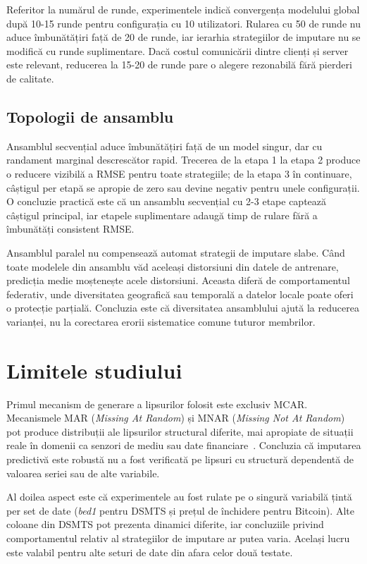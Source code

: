 Referitor la numărul de runde, experimentele indică convergența modelului global după 10-15 runde pentru configurația cu 10 utilizatori. Rularea cu 50 de runde nu aduce îmbunătățiri față de 20 de runde, iar ierarhia strategiilor de imputare nu se modifică cu runde suplimentare. Dacă costul comunicării dintre clienți și server este relevant, reducerea la 15-20 de runde pare o alegere rezonabilă fără pierderi de calitate.

\subsection{Topologii de ansamblu}

Ansamblul secvențial aduce îmbunătățiri față de un model singur, dar cu randament marginal descrescător rapid. Trecerea de la etapa 1 la etapa 2 produce o reducere vizibilă a RMSE pentru toate strategiile; de la etapa 3 în continuare, câștigul per etapă se apropie de zero sau devine negativ pentru unele configurații. O concluzie practică este că un ansamblu secvențial cu 2-3 etape captează câștigul principal, iar etapele suplimentare adaugă timp de rulare fără a îmbunătăți consistent RMSE.

Ansamblul paralel nu compensează automat strategii de imputare slabe. Când toate modelele din ansamblu văd aceleași distorsiuni din datele de antrenare, predicția medie moștenește acele distorsiuni. Aceasta diferă de comportamentul federativ, unde diversitatea geografică sau temporală a datelor locale poate oferi o protecție parțială. Concluzia este că diversitatea ansamblului ajută la reducerea varianței, nu la corectarea erorii sistematice comune tuturor membrilor.

\section{Limitele studiului}

Primul mecanism de generare a lipsurilor folosit este exclusiv MCAR. Mecanismele MAR (\textit{Missing At Random}) și MNAR (\textit{Missing Not At Random}) pot produce distribuții ale lipsurilor structural diferite, mai apropiate de situații reale în domenii ca senzori de mediu sau date financiare~\cite{rubin1976inference, little2002missing}. Concluzia că imputarea predictivă este robustă nu a fost verificată pe lipsuri cu structură dependentă de valoarea seriei sau de alte variabile.

Al doilea aspect este că experimentele au fost rulate pe o singură variabilă țintă per set de date (\textit{bed1} pentru DSMTS și prețul de închidere pentru Bitcoin). Alte coloane din DSMTS pot prezenta dinamici diferite, iar concluziile privind comportamentul relativ al strategiilor de imputare ar putea varia. Același lucru este valabil pentru alte seturi de date din afara celor două testate.

